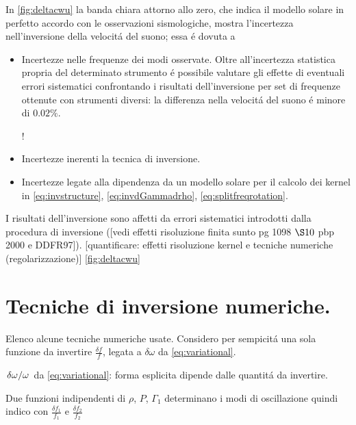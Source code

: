 \documentclass[../main.tex]{subfiles}
\begin{document}
In \ref{fig:deltacwu} la banda chiara attorno allo zero, che indica il modello solare in perfetto accordo con le osservazioni sismologiche, mostra l'incertezza nell'inversione della velocit\'a del suono; essa \'e dovuta a

\begin{itemize}

\item Incertezze nelle frequenze dei modi osservate. Oltre all'incertezza statistica propria del determinato strumento \'e possibile valutare gli effette di eventuali errori sistematici confrontando i risultati dell'inversione per set di frequenze ottenute con strumenti diversi: la differenza nella velocit\'a del suono \'e minore di $0.02\%$.

\begin{workout}
!
\end{workout}


\item Incertezze inerenti la tecnica di inversione.

\item Incertezze legate alla dipendenza da un modello solare per il calcolo dei kernel in \eqref{eq:invstructure}, \eqref{eq:invdGammadrho}, \eqref{eq:splitfreqrotation}.

\end{itemize}

\begin{workout}
I risultati dell'inversione sono affetti da errori sistematici introdotti dalla procedura di inversione ([vedi effetti risoluzione finita sunto pg 1098 $\S 10$ pbp 2000 e DDFR97]).
[quantificare: effetti risoluzione kernel e tecniche numeriche (regolarizzazione)]
\ref{fig:deltacwu}
\end{workout}

\section{Tecniche di inversione numeriche.}

Elenco alcune tecniche numeriche usate. Considero per sempicit\'a una sola funzione da invertire $\frac{\delta f}{f}$, legata a $\delta\omega$ da \eqref{eq:variational}.

\begin{workout}

$\left.{\delta\omega}\middle/{\omega}\right.$ da \eqref{eq:variational}: forma esplicita dipende dalle quantit\'a da invertire.

Due funzioni indipendenti di $\rho$, $P$, $\Gamma_1$ determinano i modi di oscillazione quindi indico con $\frac{\delta f_1}{f_1}$ e $\frac{\delta f_2}{f_2}$

\end{workout}
\end{document}
